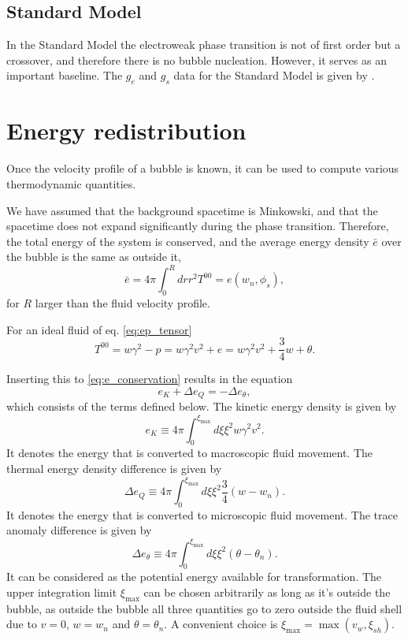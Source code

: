 \subsection{Standard Model}
In the Standard Model the electroweak phase transition is not of first order but a crossover,
and therefore there is no bubble nucleation.
However, it serves as an important baseline.
The $g_e$ and $g_s$ data for the Standard Model is given by \cite{borsanyi_lattice_2016}.


\section{Energy redistribution}
Once the velocity profile of a bubble is known, it can be used to compute various thermodynamic quantities.

We have assumed that the background spacetime is Minkowski, and that the spacetime does not expand significantly during the phase transition.
Therefore, the total energy of the system is conserved, and the average energy density $\bar{e}$ over the bubble is the same as outside it,
\begin{equation}
\bar{e} = 4 \pi \int_0^R dr r^2 T^{00} = e(w_n, \phi_s),
\label{eq:e_conservation}
\end{equation}
for $R$ larger than the fluid velocity profile.

For an ideal fluid of eq. \eqref{eq:ep_tensor}
\begin{equation}
T^{00} = w\gamma^2 - p = w\gamma^2 v^2 + e = w\gamma^2 v^2 + \frac{3}{4}w + \theta.
\end{equation}

Inserting this to \eqref{eq:e_conservation} results in the equation
\begin{equation}
e_K + \Delta e_Q = - \Delta e_\theta,
\end{equation}
which consists of the terms defined below.
The kinetic energy density is given by
\begin{equation}
e_K \equiv 4 \pi \int_0^{\xi_\text{max}} d\xi \xi^2 w \gamma^2 v^2.
\end{equation}
It denotes the energy that is converted to macroscopic fluid movement.
The thermal energy density difference is given by
\begin{equation}
\Delta e_Q \equiv 4 \pi \int_0^{\xi_\text{max}} d\xi \xi^2 \frac{3}{4} (w - w_n).
\end{equation}
It denotes the energy that is converted to microscopic fluid movement.
The trace anomaly difference is given by
\begin{equation}
\Delta e_\theta \equiv 4 \pi \int_0^{\xi_\text{max}} d\xi \xi^2 (\theta - \theta_n).
\end{equation}
It can be considered as the potential energy available for transformation.
The upper integration limit $\xi_\text{max}$ can be chosen arbitrarily as long as it's outside the bubble, as outside the bubble all three quantities go to zero outside the fluid shell due to $v=0$, $w=w_n$ and $\theta = \theta_n$.
A convenient choice is $\xi_\text{max} = \max (v_w, \xi_{sh})$.


